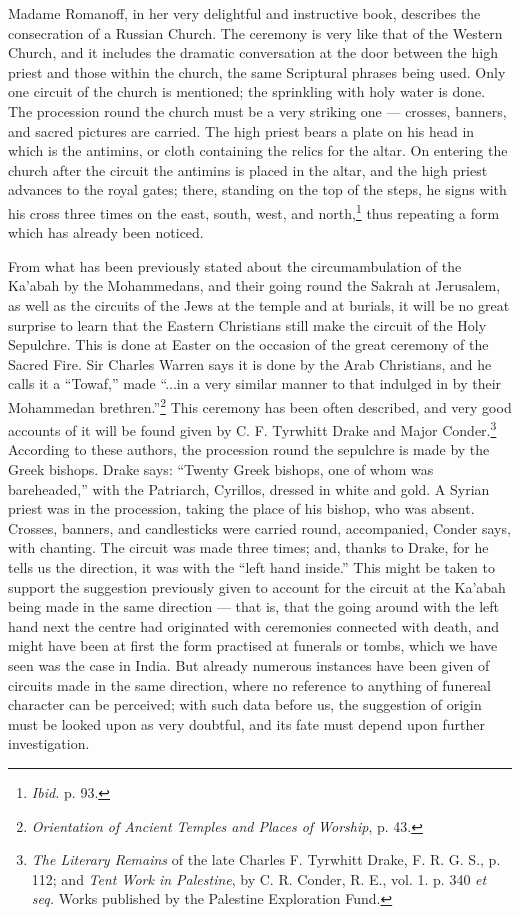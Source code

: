 \documentclass[a4paper, 11pt, oneside, polutonikogreek, english]{article}
\begin{document}
Madame Romanoff, in her very delightful and instructive book, describes the consecration of a Russian Church. The ceremony is very like that of the Western Church, and it includes the dramatic conversation at the door between the high priest and those within the church, the same Scriptural phrases being used. Only one circuit of the church is mentioned; the sprinkling with holy water is done. The procession round the church must be a very striking one --- crosses, banners, and sacred pictures are carried. The high priest bears a plate on his head in which is the antimins, or cloth containing the relics for the altar. On entering the church after the circuit the antimins is placed in the altar, and the high priest advances to the royal gates; there, standing on the top of the steps, he signs with his cross three times on the east, south, west, and north,\footnote{\emph{Ibid.} p. 93.} thus repeating a form which has already been noticed.

From what has been previously stated about the circumambulation of the Ka'abah by the Mohammedans, and their going round the Sakrah at Jerusalem, as well as the circuits of the Jews at the temple and at burials, it will be no great surprise to learn that the Eastern Christians still make the circuit of the Holy Sepulchre. This is done at Easter on the occasion of the great ceremony of the Sacred Fire. Sir Charles Warren says it is done by the Arab Christians, and he calls it a ``Towaf,'' made ``...in a very similar manner to that indulged in by their Mohammedan brethren.''\footnote{\emph{Orientation of Ancient Temples and Places of Worship}, p. 43.} This ceremony has been often described, and very good accounts of it will be found given by C. F. Tyrwhitt Drake and Major Conder.\footnote{\emph{The Literary Remains} of the late Charles F. Tyrwhitt Drake, F. R. G. S., p. 112; and \emph{Tent Work in Palestine}, by C. R. Conder, R. E., vol. 1. p. 340 \emph{et seq.} Works published by the Palestine Exploration Fund.} According to these authors, the procession round the sepulchre is made by the Greek bishops. Drake says: ``Twenty Greek bishops, one of whom was bareheaded,'' with the Patriarch, Cyrillos, dressed in white and gold. A Syrian priest was in the procession, taking the place of his bishop, who was absent. Crosses, banners, and candlesticks were carried round, accompanied, Conder says, with chanting. The circuit was made three times; and, thanks to Drake, for he tells us the direction, it was with the ``left hand inside.'' This might be taken to support the suggestion previously given to account for the circuit at the Ka'abah being made in the same direction --- that is, that the going around with the left hand next the centre had originated with ceremonies connected with death, and might have been at first the form practised at funerals or tombs, which we have seen was the case in India. But already numerous instances have been given of circuits made in the same direction, where no reference to anything of funereal character can be perceived; with such data before us, the suggestion of origin must be looked upon as very doubtful, and its fate must depend upon further investigation.
\clearpage
\end{document}
